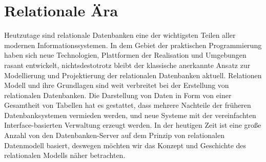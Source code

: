 


















\section{Relationale Ära} %


Heutzutage sind relationale Datenbanken eine der wichtigsten Teilen aller modernen Informationssystemen. In dem Gebiet der praktischen Programmierung haben sich neue Technologien, Plattformen der Realisation und Umgebungen rasant entwickelt, nichtsdestotrotz bleibt der klassische anerkannte Ansatz zur Modellierung und Projektierung der relationalen Datenbanken aktuell. Relationen Modell und ihre Grundlagen sind weit verbreitet bei der Erstellung von relationalen Datenbanken. Die Darstellung von Daten in Form von einer Gesamtheit von Tabellen hat es gestattet, dass mehrere Nachteile der früheren Datenbanksystemen vermieden werden, und neue Systeme mit der vereinfachten Interface-basierten Verwaltung erzeugt werden. In der heutigen Zeit ist eine große Anzahl von den Datenbanken-Server auf dem Prinzip von relationalen Datenmodell basiert, deswegen möchten wir das Konzept und Geschichte des relationalen Modells näher betrachten.


